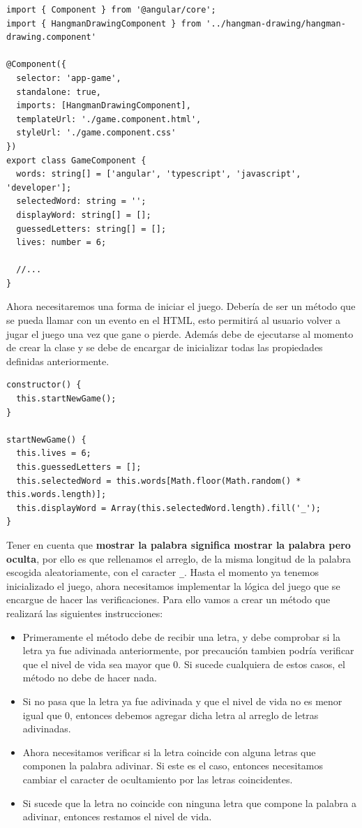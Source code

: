 \documentclass[10pt, a4paper]{article}
\newcommand{\mts}[1]{\texttt{#1}}
\begin{document}
\begin{verbatim}
import { Component } from '@angular/core';
import { HangmanDrawingComponent } from '../hangman-drawing/hangman-drawing.component'

@Component({
  selector: 'app-game',
  standalone: true,
  imports: [HangmanDrawingComponent],
  templateUrl: './game.component.html',
  styleUrl: './game.component.css'
})
export class GameComponent {
  words: string[] = ['angular', 'typescript', 'javascript', 'developer'];
  selectedWord: string = '';
  displayWord: string[] = [];
  guessedLetters: string[] = [];
  lives: number = 6;
  
  //...
}
\end{verbatim}

Ahora necesitaremos una forma de iniciar el juego. Debería de ser un método que se pueda llamar con un evento en el HTML, esto permitirá al usuario volver a jugar el juego una vez que gane o pierde. Además debe de ejecutarse al momento de crear la clase y se debe de encargar de inicializar todas las propiedades definidas anteriormente.

\begin{verbatim}
constructor() {
  this.startNewGame();
}

startNewGame() {
  this.lives = 6;
  this.guessedLetters = [];
  this.selectedWord = this.words[Math.floor(Math.random() * this.words.length)];
  this.displayWord = Array(this.selectedWord.length).fill('_');
}
\end{verbatim}

Tener en cuenta que \textbf{mostrar la palabra significa mostrar la palabra pero oculta}, por ello es que rellenamos el arreglo, de la misma longitud de la palabra escogida aleatoriamente, con el caracter \mts{_}.
\singlespacing
Hasta el momento ya tenemos inicializado el juego, ahora necesitamos implementar la lógica del juego que se encargue de hacer las verificaciones. Para ello vamos a crear un método que realizará las siguientes instrucciones:

\begin{itemize}
  \item Primeramente el método debe de recibir una letra, y debe comprobar si la letra ya fue adivinada anteriormente, por precaución tambien podría verificar que el nivel de vida sea mayor que 0. Si sucede cualquiera de estos casos, el método no debe de hacer nada.
  \item Si no pasa que la letra ya fue adivinada y que el nivel de vida no es menor igual que 0, entonces debemos agregar dicha letra al arreglo de letras adivinadas.
  \item Ahora necesitamos verificar si la letra coincide con alguna letras que componen la palabra adivinar. Si este es el caso, entonces necesitamos cambiar el caracter de ocultamiento por las letras coincidentes.
  \item Si sucede que la letra no coincide con ninguna letra que compone la palabra a adivinar, entonces restamos el nivel de vida.
\end{itemize}
\end{document}
